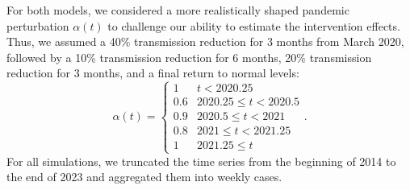 \documentclass[12pt]{article}
\begin{document}
For both models, we considered a more realistically shaped pandemic perturbation $\alpha(t)$ to challenge our ability to estimate the intervention effects.
Thus, we assumed a 40\% transmission reduction for 3 months from March 2020, followed by a 10\% transmission reduction for 6 months, 20\% transmission reduction for 3 months, and a final return to normal levels:
\begin{equation}
\alpha(t) = \begin{cases}
1 & t < 2020.25\\
0.6 & 2020.25 \leq t < 2020.5\\
0.9 & 2020.5 \leq t < 2021\\
0.8 & 2021 \leq t < 2021.25\\
1 & 2021.25 \leq t
\end{cases}.
\end{equation}
For all simulations, we truncated the time series from the beginning of 2014 to the end of 2023 and aggregated them into weekly cases.
\end{document}
